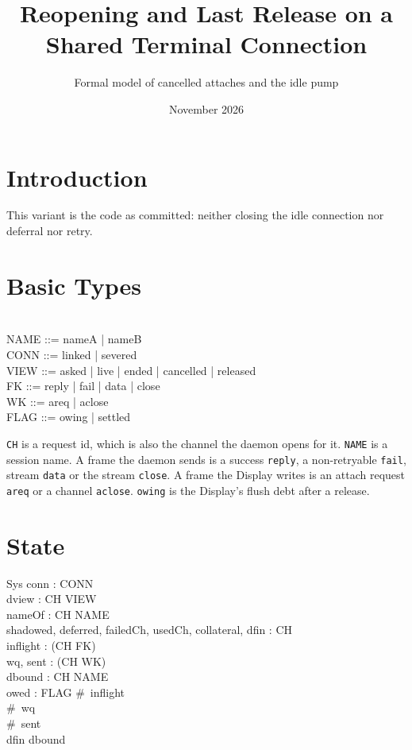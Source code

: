 \documentclass[a4paper,10pt,fleqn]{article}
\begin{document}
\title{Reopening and Last Release on a Shared Terminal Connection}
\author{Formal model of cancelled attaches and the idle pump}
\date{November 2026}
\maketitle

\section{Introduction}

This variant is the code as committed: neither closing the idle connection nor deferral nor retry.

\section{Basic Types}

\begin{zed}
  [CH] \\
  NAME ::= nameA | nameB \\
  CONN ::= linked | severed \\
  VIEW ::= asked | live | ended | cancelled | released \\
  FK ::= reply | fail | data | close \\
  WK ::= areq | aclose \\
  FLAG ::= owing | settled
\end{zed}

\texttt{CH} is a request id, which is also the channel the daemon opens for
it.  \texttt{NAME} is a session name.  A frame the daemon sends is a
success \texttt{reply}, a non-retryable \texttt{fail}, stream \texttt{data}
or the stream \texttt{close}.  A frame the Display writes is an attach
request \texttt{areq} or a channel \texttt{aclose}.  \texttt{owing} is the
Display's flush debt after a release.

\section{State}

\begin{schema}{Sys}
  conn : CONN \\
  dview : CH \pfun VIEW \\
  nameOf : CH \pfun NAME \\
  shadowed, deferred, failedCh, usedCh, collateral, dfin : \power CH \\
  inflight : \seq (CH \cross FK) \\
  wq, sent : \seq (CH \cross WK) \\
  dbound : CH \pfun NAME \\
  owed : FLAG
\where
  \#~inflight  \\
  \#~wq  \\
  \#~sent  \\
  dfin \subseteq \dom dbound
\end{schema}
\end{document}

